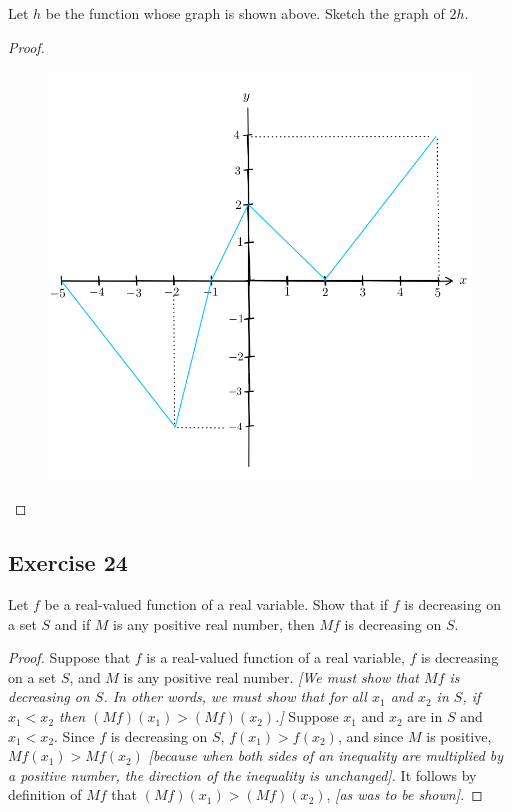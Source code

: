 \documentclass[14pt]{extarticle}
\begin{document}
Let \(h\) be the function whose graph is shown above. Sketch the graph of \(2h\).

\begin{proof}
\begin{figure}[ht!]
\centering
\includegraphics[scale=0.3]{../images/11.1.23.2.png}
\end{figure}
\end{proof}

\subsection{Exercise 24}
Let \(f\) be a real-valued function of a real variable. Show that if \(f\) is decreasing on a set \(S\) and if \(M\) is any 
positive real number, then \(Mf\) is decreasing on \(S\).

\begin{proof}
Suppose that \(f\) is a real-valued function of a real variable, \(f\) is decreasing on a set \(S\), and \(M\) is any 
positive real number. {\it [We must show that \(Mf\) is decreasing on \(S\). In other words, we must show that for all 
\(x_1\) and \(x_2\) in \(S\), if \(x_1 < x_2\) then \((Mf)(x_1) > (Mf)(x_2)\).]} Suppose \(x_1\) and \(x_2\) are in 
\(S\) and \(x_1 < x_2\). Since \(f\) is decreasing on \(S\), \(f(x_1) > f(x_2)\), and since \(M\) is positive, \(Mf(x_1) >
Mf(x_2)\) {\it [because when both sides of an inequality are multiplied by a positive number, the direction of the 
inequality is unchanged].} It follows by definition of \(Mf\) that \((Mf)(x_1) > (Mf)(x_2)\), {\it [as was to be shown].}
\end{proof}
\end{document}
